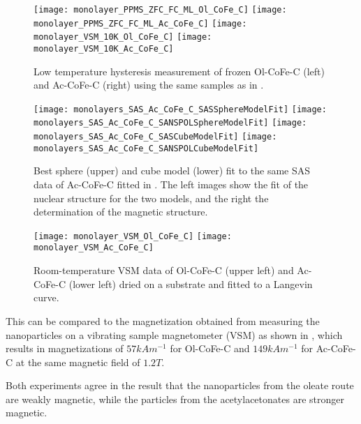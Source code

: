 \documentclass[\main/dresen_thesis.tex]{subfiles}
\begin{document}
    \begin{figure}[tb]
      \centering
      \texttt{[image: monolayer\_PPMS\_ZFC\_FC\_ML\_Ol\_CoFe\_C]}
      \texttt{[image: monolayer\_PPMS\_ZFC\_FC\_ML\_Ac\_CoFe\_C]}
      \texttt{[image: monolayer\_VSM\_10K\_Ol\_CoFe\_C]}
      \texttt{[image: monolayer\_VSM\_10K\_Ac\_CoFe\_C]}
      \caption{\label{fig:monolaye rs:nanoparticle:vsm10K}Low temperature hysteresis measurement of frozen Ol-CoFe-C (left) and Ac-CoFe-C (right) using the same samples as in .}
    \end{figure}

    \begin{figure}[tb]
      \centering
      \texttt{[image: monolayers\_SAS\_Ac\_CoFe\_C\_SASSphereModelFit]}
      \texttt{[image: monolayers\_SAS\_Ac\_CoFe\_C\_SANSPOLSphereModelFit]}
      \texttt{[image: monolayers\_SAS\_Ac\_CoFe\_C\_SASCubeModelFit]}
      \texttt{[image: monolayers\_SAS\_Ac\_CoFe\_C\_SANSPOLCubeModelFit]}
      \caption{\label{fig:monolayers:nanoparticle:sas:SphereCubeFit}Best sphere (upper) and cube model (lower) fit to the same SAS data of Ac-CoFe-C fitted in . The left images show the fit of the nuclear structure for the two models, and the right the determination of the magnetic structure.}
    \end{figure}


    \begin{figure}[tb]
      \centering
      \texttt{[image: monolayer\_VSM\_Ol\_CoFe\_C]}
      \texttt{[image: monolayer\_VSM\_Ac\_CoFe\_C]}
      \caption{\label{fig:monolayers:nanoparticle:vsm}Room-temperature VSM data of Ol-CoFe-C (upper left) and Ac-CoFe-C (lower left) dried on a substrate and fitted to a Langevin curve.}
    \end{figure}

    This can be compared to the magnetization obtained from measuring the nanoparticles on a vibrating sample magnetometer (VSM) as shown in , which results in magnetizations of $57 \unit{kAm^{-1}}$ for Ol-CoFe-C and $149 \unit{kAm^{-1}}$ for Ac-CoFe-C at the same magnetic field of $1.2 \unit{T}$.

    Both experiments agree in the result that the nanoparticles from the oleate route are weakly magnetic, while the particles from the acetylacetonates are stronger magnetic.

    
\end{document}
